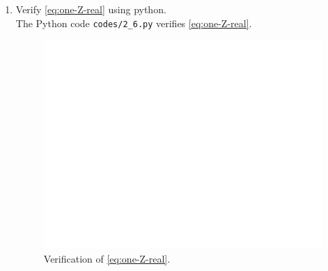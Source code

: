 \documentclass[journal,12pt,twocolumn]{IEEEtran}
\renewcommand\thesection{\arabic{section}}
\begin{document}
\begin{enumerate}[label=\thesection.\arabic*,ref=\thesection.\theenumi]
\item Verify 
\eqref{eq:one-Z-real}
using python.\\
\solution The Python code \texttt{codes/2\_6.py} verifies \eqref{eq:one-Z-real}.
\begin{figure}[!ht]
    \includegraphics[width=\columnwidth]{figs/2_6.png}
    \caption{Verification of \eqref{eq:one-Z-real}.} 
    \label{fig:ver-real}
\end{figure}
\end{enumerate}
\end{document}
